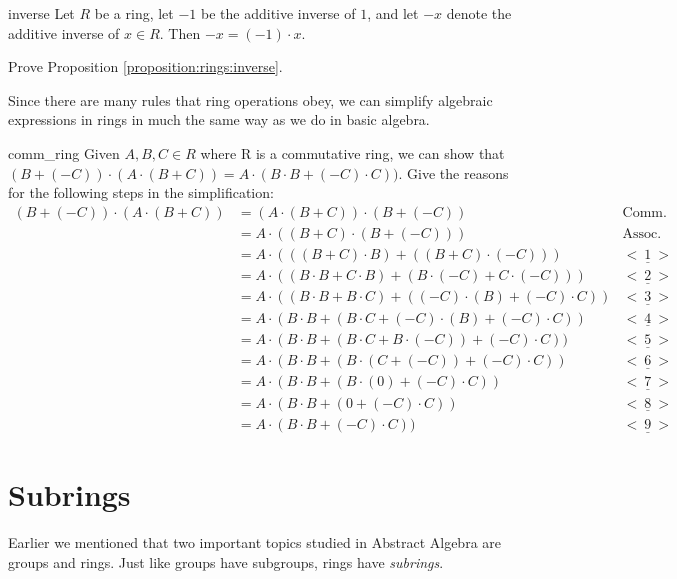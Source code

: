 \begin{prop}{inverse}
Let $R$ be a ring, let $-1$ be the additive inverse of $1$, and let $-x$ denote the additive inverse of $x\in R$. Then $-x=(-1)\cdot x$.
\end{prop}

\begin{exercise}{}
Prove Proposition \ref{proposition:rings:inverse}.
\end{exercise}

Since there are many rules that ring operations obey,
we can simplify algebraic expressions in rings in much the same way as we do in basic algebra.

\begin{exercise}{comm_ring}
Given $A,B,C\in R$ where R is a commutative ring, we can show that $(B+(-C))\cdot(A\cdot(B+C))=A\cdot(B\cdot B+(-C)\cdot C))$. Give the reasons for the following steps in the simplification:
\begin{align*}
(B+(-C))\cdot(A\cdot(B+C))&=(A\cdot(B+C))\cdot(B+(-C)) & \text{Comm. prop.}\\   
&=A\cdot((B+C)\cdot(B+(-C))) & \text{Assoc. prop.}\\
&=A\cdot(((B+C)\cdot B)+((B+C)\cdot(-C))) & \underline{<~1~>}\\
&=A\cdot((B\cdot B+C\cdot B)+(B\cdot (-C)+C\cdot (-C))) & \underline{<~2~>}\\
&=A\cdot((B\cdot B+B\cdot C)+((-C)\cdot(B)+(-C)\cdot C))  & \underline{<~3~>}\\
&=A\cdot(B\cdot B+(B\cdot C+(-C)\cdot(B)+(-C)\cdot C))  & \underline{<~4~>}\\
&=A\cdot(B\cdot B+(B\cdot C+B\cdot(-C))+(-C)\cdot C)) & \underline{<~5~>}\\
&=A\cdot(B\cdot B+(B\cdot(C+(-C))+(-C)\cdot C)) & \underline{<~6~>}\\
&=A\cdot(B\cdot B+(B\cdot(0)+(-C)\cdot C)) & \underline{<~7~>}\\
&=A\cdot(B\cdot B+(0+(-C)\cdot C)) & \underline{<~8~>}\\
&=A\cdot(B\cdot B+(-C)\cdot C)) & \underline{<~9~>}
\end{align*}
\end{exercise}

\section{Subrings}
\label{sec:Rings:Subrings}

Earlier we mentioned that two important topics studied in Abstract Algebra are groups and rings. Just like groups have subgroups, rings have \emph{subrings}.

